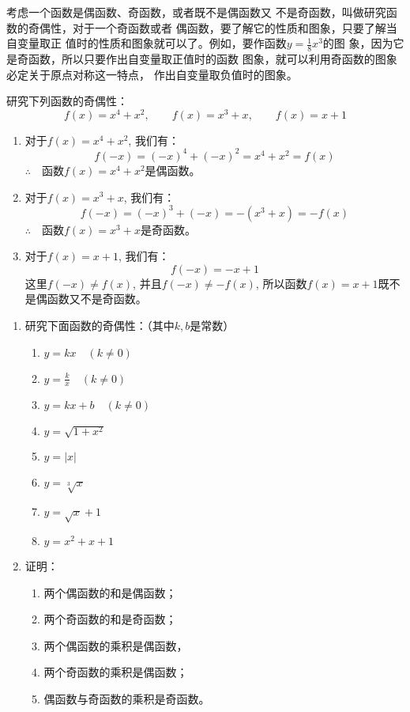 考虑一个函数是偶函数、奇函数，或者既不是偶函数又
不是奇函数，叫做研究函数的奇偶性，对于一个奇函数或者
偶函数，要了解它的性质和图象，只要了解当自变量取正
值时的性质和图象就可以了。例如，要作函数$y=\frac{1}{8}x^3$的图
象，因为它是奇函数，所以只要作出自变量取正值时的函数
图象，就可以利用奇函数的图象必定关于原点对称这一特点，
作出自变量取负值时的图象。

\begin{example}
研究下列函数的奇偶性：
\[f(x)=x^4+x^2,\qquad f(x)=x^3+x,\qquad f(x)=x+1\]   
\end{example}

\begin{solution}
\begin{enumerate}
    \item 对于$f(x)=x^4+x^2$, 我们有：
    \[f(-x)=(-x)^4+(-x)^2=x^4+x^2=f(x)\]
    $\therefore\quad $函数$f(x)=x^4+x^2$是偶函数。
    \item 对于$f(x)=x^3+x$, 我们有：
    \[f(-x)=(-x)^3+(-x)=-(x^3+x)=-f(x)\]
    $\therefore\quad $函数$f(x)=x^3+x$是奇函数。
    \item 对于$f(x)=x+1$, 我们有：
    \[f(-x)=-x+1\]
    这里$f(-x)\ne f(x)$, 并且$f(-x)\ne -f(x)$, 所以函数$f(x)=
x+1$既不是偶函数又不是奇函数。
\end{enumerate} 
\end{solution}

\begin{ex}
\begin{enumerate}
    \item  研究下面函数的奇偶性：（其中$k,b$是常数）
\begin{multicols}{2}
\begin{enumerate}
    \item $y=kx\quad (k\ne 0)$
    \item $y=\frac{k}{x}\quad (k\ne 0)$
    \item $y=kx+b\quad (k\ne 0)$
    \item $y=\sqrt{1+x^2}$
    \item $y=|x|$
    \item $y=\sqrt[3]{x}$
    \item $y=\sqrt{x}+1$
    \item $y=x^2+x+1$
\end{enumerate}
\end{multicols}
\item 证明：
\begin{enumerate}
    \item 两个偶函数的和是偶函数；
    \item 两个奇函数的和是奇函数；
    \item 两个偶函数的乘积是偶函数，
    \item 两个奇函数的乘积是偶函数；
    \item 偶函数与奇函数的乘积是奇函数。
\end{enumerate}
\end{enumerate}
\end{ex}

